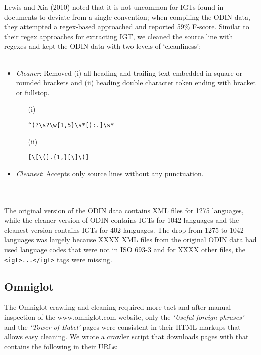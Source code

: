 \documentclass[11pt]{article}
\begin{document}
Lewis and Xia (2010) noted that it is not uncommon for IGTs found in documents to deviate from a single convention; when compiling the ODIN data, they attempted a regex-based approached and reported 59\% F-score. Similar to their regex approaches for extracting IGT, we cleaned the source line with regexes and kept the ODIN data with two levels of `cleanliness':
\\ \\
\begin{minipage}{\columnwidth}
\begin{itemize}
\item \emph{Cleaner}: Removed (i) all heading and trailing text embedded in square or rounded brackets and (ii) heading double character token ending with bracket or fullstop.
\begin{itemize}
\item[(i)]
\begin{Verbatim}
^(?\s?\w{1,5}\s*[):.]\s*
\end{Verbatim}
\item[(ii)] 
\begin{Verbatim}
[\[\(].{1,}[\]\)]
\end{Verbatim}
\end{itemize}
\item \emph{Cleanest}: Accepts only source lines without any punctuation.
\end{itemize}
\end{minipage}
\\ \\
\noindent The original version of the ODIN data contains XML files for 1275 languages, while the cleaner version of ODIN contains IGTs for 1042 languages and the cleanest version contains IGTs for 402 languages. The drop from 1275 to 1042 languages was largely because {\color{red} XXXX} XML files from the original ODIN data had used language codes that were not in ISO 693-3 and for {\color{red} XXXX} other files, the \texttt{<igt>...</igt>} tags were missing. 

\subsection{Omniglot}

The Omniglot crawling and cleaning required more tact and after manual inspection of the www.omniglot.com website, only the \emph{`Useful foreign phrases'} and the \emph{`Tower of Babel'} pages were consistent in their HTML markups that allows easy cleaning. We wrote a crawler script that downloads pages with that contains the following in their URLs:
\end{document}
